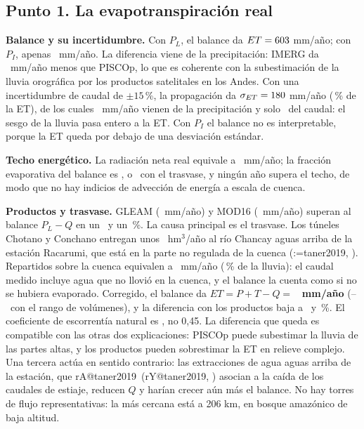 \documentclass[12pt,a4paper]{article}
\makeatletter
\newcommand{\parencite}[2][]{(\@tempswafalse\@for\rk:=#2\do{\if@tempswa; \fi\@tempswatrue\csname rA@\rk\endcsname, \csname rY@\rk\endcsname}\ifx\relax#1\relax\else, #1\fi)}
\newcommand{\textcite}[2][]{\csname rA@#2\endcsname\ (\csname rY@#2\endcsname\ifx\relax#1\relax\else, #1\fi)}
\makeatother
\begin{document}
\subsection{Punto 1. La evapotranspiración real}

\textbf{Balance y su incertidumbre.} Con $P_L$, el balance da $ET=603$ mm/año; con $P_I$, apenas \ETbalI\ mm/año. La diferencia viene de la precipitación: IMERG da \DifPLPI\ mm/año menos que PISCOp, lo que es coherente con la subestimación de la lluvia orográfica por los productos satelitales en los Andes. Con una incertidumbre de caudal de $\pm15$\,\%, la propagación da $\sigma_{ET}=180$ mm/año (\SigmaETpct\,\% de la ET), de los cuales \SigmaP\ mm/año vienen de la precipitación y solo \SigmaQ\ del caudal: el sesgo de la lluvia pasa entero a la ET. Con $P_I$ el balance no es interpretable, porque la ET queda por debajo de una desviación estándar.

\textbf{Techo energético.} La radiación neta real equivale a \RnLambda\ mm/año; la fracción evaporativa del balance es \FEbal, o \TrFE\ con el trasvase, y ningún año supera el techo, de modo que no hay indicios de advección de energía a escala de cuenca.

\textbf{Productos y trasvase.} GLEAM (\ETgleam\ mm/año) y MOD16 (\ETmod\ mm/año) superan al balance $P_L-Q$ en un \SobreGleam\ y un \SobreMod\,\%. La causa principal es el trasvase. Los túneles Chotano y Conchano entregan unos \TrHmCen\ hm$^3$/año al río Chancay aguas arriba de la estación Racarumi, que está en la parte no regulada de la cuenca \parencite{taner2019}. Repartidos sobre la cuenca equivalen a \TrMmCen\ mm/año (\TrPctP\,\% de la lluvia): el caudal medido incluye agua que no llovió en la cuenca, y el balance la cuenta como si no se hubiera evaporado. Corregido, el balance da $ET=P+T-Q=$ \textbf{\ETcorrCen\ mm/año} (\ETcorrInf--\ETcorrSup\ con el rango de volúmenes), y la diferencia con los productos baja a \TrGleam\ y \TrMod\,\%. El coeficiente de escorrentía natural es \TrCoefNat, no 0,45. La diferencia que queda es compatible con las otras dos explicaciones: PISCOp puede subestimar la lluvia de las partes altas, y los productos pueden sobrestimar la ET en relieve complejo. Una tercera actúa en sentido contrario: las extracciones de agua aguas arriba de la estación, que \textcite{taner2019} asocian a la caída de los caudales de estiaje, reducen $Q$ y harían crecer aún más el balance. No hay torres de flujo representativas: la más cercana está a 206 km, en bosque amazónico de baja altitud.
\end{document}
